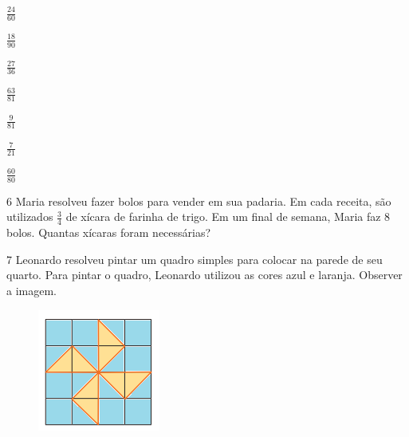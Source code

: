\begin{escolha}
\item $\frac{24}{60}$ 

\item $\frac{18}{90}$ 

\item $\frac{27}{36}$ 

\item $\frac{63}{81}$ 

\item $\frac{9}{81}$ 

\item $\frac{7}{21}$ 

\item $\frac{60}{80}$ 

\end{escolha}

\num{6}  Maria resolveu fazer bolos para vender em sua padaria. Em cada
receita, são utilizados $\frac{3}{4}$ de xícara de farinha de trigo. Em um final
de semana, Maria faz $8$ bolos. Quantas xícaras foram necessárias?







\num{7}  Leonardo resolveu pintar um quadro simples para colocar na parede de
seu quarto. Para pintar o quadro, Leonardo utilizou as cores azul e laranja.
Observer a imagem.

\begin{figure}[H]
\includegraphics[width=1.58333in,height=1.57292in]{./imgSAEB_6_MAT/media/image33.png}
\end{figure}

